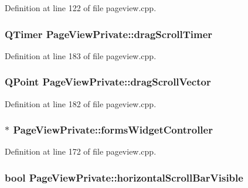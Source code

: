 Definition at line 122 of file pageview.\+cpp.

\hypertarget{classPageViewPrivate_a2aefc2e5ac5f4824c39593264277ad6a}{
\subsubsection[{drag\+Scroll\+Timer}]{\setlength{\rightskip}{0pt plus 5cm}Q\+Timer Page\+View\+Private\+::drag\+Scroll\+Timer}}\label{classPageViewPrivate_a2aefc2e5ac5f4824c39593264277ad6a}


Definition at line 183 of file pageview.\+cpp.

\hypertarget{classPageViewPrivate_a0e761e758cf53fb4147c7e3aa4f06851}{
\subsubsection[{drag\+Scroll\+Vector}]{\setlength{\rightskip}{0pt plus 5cm}Q\+Point Page\+View\+Private\+::drag\+Scroll\+Vector}}\label{classPageViewPrivate_a0e761e758cf53fb4147c7e3aa4f06851}


Definition at line 182 of file pageview.\+cpp.

\hypertarget{classPageViewPrivate_a0b24eb01788092e1699d8380c88fb295}{
\subsubsection[{forms\+Widget\+Controller}]{$\ast$ Page\+View\+Private\+::forms\+Widget\+Controller}}\label{classPageViewPrivate_a0b24eb01788092e1699d8380c88fb295}


Definition at line 172 of file pageview.\+cpp.

\hypertarget{classPageViewPrivate_accc11688dc248fe9a09713b1c1acbe5e}{
\subsubsection[{horizontal\+Scroll\+Bar\+Visible}]{\setlength{\rightskip}{0pt plus 5cm}bool Page\+View\+Private\+::horizontal\+Scroll\+Bar\+Visible}}\label{classPageViewPrivate_accc11688dc248fe9a09713b1c1acbe5e}


